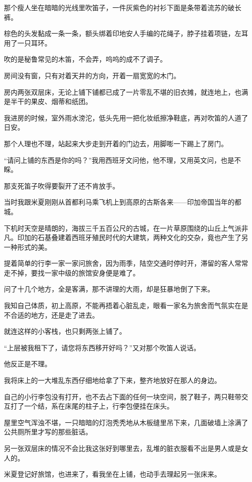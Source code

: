\par 那个瘦人坐在暗暗的光线里吹笛子，一件灰紫色的衬衫下面是条带着流苏的破长裤。
\par 棕色的头发黏成一条一条，额头绑着印地安人手编的花绳子，脖子挂着项链，左耳用了一只耳环。
\par 吹的是秘鲁常见的木笛，不会弄，呜呜的成不了调子。
\par 房间没有窗，只有对着天井的方向，开着一扇宽宽的木门。
\par 房内两张双层床，无论上铺下铺都已成了一片零乱不堪的旧衣摊，就连地上，也满是半干的果皮、烟蒂和纸团。
\par 我进房的时候，室外雨水滂沱，低头先用一把化妆纸擦净鞋底，再对吹笛的人道了日安。
\par 那个人理也不理，站起来大步走到开着的门边去，用脚嘭一下踢上了房门。
\par “请问上铺的东西是你的吗？”我用西班牙文问他，他不理，又用英文问，也是不睬。
\par 那支死笛子吹得要裂开了还不肯放手。
\par 当时我跟米夏刚刚从首都利马乘飞机上到高原的古斯各来——印加帝国当年的都城。
\par 下机时天空是晴朗的，海拔三千五百公尺的古城，在一片草原围绕的山丘上气派非凡。印加的石基叠建着西班牙殖民时代的大建筑，两种文化的交杂，竟也产生了另一种形式的美。
\par 提着简单的行李一家一家问旅舍，因为雨季，陆空交通时停时开，滞留的客人常常走不掉，要找一家中级的旅馆安身便是难了。
\par 问了十几个地方，全是客满，那不讲理的大雨，却是狂暴地倒了下来。
\par 我知自己体质，初上高原，不能再捂着心脏乱走，眼看一家名为旅舍而气氛实在是不合适的地方，还是走了进去。
\par 就连这样的小客栈，也只剩两张上铺了。
\par “上层被我租下了，请您将东西移开好吗？”又对那个吹笛人说话。
\par 他反正是不理。
\par 我将床上的一大堆乱东西仔细地给拿了下来，整齐地放好在那人的身边。
\par 自己的小行李包没有打开，也不去占下面的任何一块空间，脱了鞋子，两只鞋带交互打了一个结，系在床尾的柱子上，行李包便挂在床头。
\par 屋里空气浑浊不堪，一只暗暗的灯泡秃秃地从木板缝里吊下来，几面破墙上涂满了公共厕所里才写的那些脏话。
\par 另一张双层床的情况不会比我这张好到哪里去，乱堆的脏衣服看不出是男人或是女人的。
\par 米夏登记好旅馆，也进来了，看我坐在上铺，也动手去理起另一张床来。
